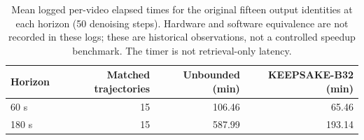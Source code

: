 \begin{table}[ht]
\centering
\small
\begin{tabular}{lrrr}
\toprule
Horizon & Matched trajectories & Unbounded (min) & KEEPSAKE-B32 (min) \\
\midrule
60 s & 15 & 106.46 & 65.46 \\
180 s & 15 & 587.99 & 193.14 \\
\bottomrule
\end{tabular}
\caption{Mean logged per-video elapsed times for the original fifteen output identities at each horizon (50 denoising steps). Hardware and software equivalence are not recorded in these logs; these are historical observations, not a controlled speedup benchmark. The timer is not retrieval-only latency.}
\label{tab:historical-elapsed}
\end{table}
